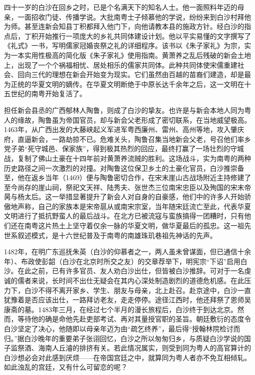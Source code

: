 四十一岁的白沙在回乡之时，已是个名满天下的知名人士。他一面照料年迈的母亲，一面招收门徒、传播学说。大批南粤士子倾慕他的学说，纷纷来到白沙村拜他为师。甚至连新会知县丁积都拜入他门下，向他请教本县的施政方针。经白沙的指点后，丁积开始推行一项庞大的乡礼共同体建设计划。他以平实易懂的文字撰写了《礼式》一书，写明儒家冠婚丧祭之礼的详细程序。该书以《朱子家礼》为宗，实为一本实用性极高的简化版《朱子家礼》使用指南。黄萧养之乱后残破的新会土地上，出现了一个个祸福相忧、居处相乐的儒家共同体。此种共同体使宋儒重建社会、回向三代的理想在新会开始变为现实。它们虽然由百越的苗裔们建造，却是最为正统的华夏文明的嫡传。在华夏文明断绝于中原长达千余年之后，这一文明在十五世纪的南粤开始复活了。

担任新会县丞的广西郁林人陶鲁，则成了白沙的挚友。也许是与新会本地人同为粤人的缘故，陶鲁虽为帝国官员，却与新会父老形成了密切联系，在当地威望极高。1463年，从广西出发的大藤峡起义军进军粤西廉州、雷州、高州等地，攻入肇庆府，直逼新会，一路劫掠不已。危难关头，陶鲁召集当地新会父老，号召他们率乡党子弟“死守城邑、保家族”，得到极其热烈的回应，最终打赢了一场壮烈的守城战，复制了佛山土豪在十四年前对黄萧养流贼的胜利。这场战斗，实为南粤的两种历史路径之间一次激烈的对撞。对陶鲁这位保卫乡土的土豪化官员，白沙推崇备至，他在返乡当年（1469）便与陶鲁密切合作，在宋末崖山古战场附近主持修建了至今尚存的崖山祠，祭祀文天祥、陆秀夫、张世杰三位南宋忠臣以及殉国的宋末帝昺与杨太后。这一举措显著提升了新会人对自身的自豪感，他们中的许多人开始骄傲地声称，自己的家族本是宋帝扈从或南宋宗室，当年随宋廷流亡至此，代表华夏文明进行了抵抗野蛮人的最后战斗。在北方已被流寇与蛮族搞得一团糟时，只有他们还在南粤这片热土上坚守着仅余一脉的华夏文明，做华夏最后的孤忠。这一祖先世系叙述模式，是十六世纪普及于南粤的南雄珠玑巷祖先神话的先声。

1482年，在明广东巡抚朱英（白沙的仰慕者之一，两人虽未曾谋面，但已通信十余年）、布政使彭韶（白沙在北京时所交之友）的交章荐举下，明宪宗“下诏”启用白沙。在此之前，已有许多官员、友人劝白沙出仕，但皆被白沙推辞。可对于一名虔诚的儒者来说，长时间不出仕无疑会在其内心深处制造剧烈的道德危机感。在此压力下，白沙不得不离开家乡、学生、朋友与母亲，北上赴召。赴京途中，白沙一直犹豫着是否应该出仕，一路拜访老友，走走停停。途径江西时，他还拜祭了恩师吴康斋的墓。1483年三月，在经过七个半月的漫长旅程后，白沙终于到达北京。然而，等待他的确是命他先赴吏部考试、再对其量授官职的圣旨。朝廷敷衍的态度令白沙坚定了决心，他随即以母亲年迈为由“疏乞终养”，最后得“授翰林院检讨而归。”据白沙晚年的重要弟子张诩回忆，白沙之所以匆匆归乡，与质疑白沙学说的国子监祭酒、海南人丘濬的排挤有关。若此情况属实，则受到同为粤人的高官算计的白沙想必会对此感到厌烦——在帝国宫廷之中，就算同为粤人者亦不免互相倾轧。如此浊乱的宫廷，又有什么可留恋的呢？

